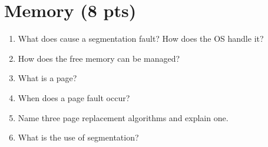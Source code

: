 \documentclass[11pt]{article}
\begin{document}
\section{Memory (8 pts)}
	\begin{enumerate}
		\item What does cause a segmentation fault? How does the OS handle it? %
		\vspace{1cm}
		\item How does the free memory can be managed? %
		\vspace{2cm}
		\item What is a page? %
		\vspace{1cm}
		\item When does a page fault occur? %
		\vspace{1cm}
		\item Name three page replacement algorithms and explain one. %
		\vspace{1cm}
		\item What is the use of segmentation? %
		\vspace{1cm}
	\end{enumerate}
\end{document}
